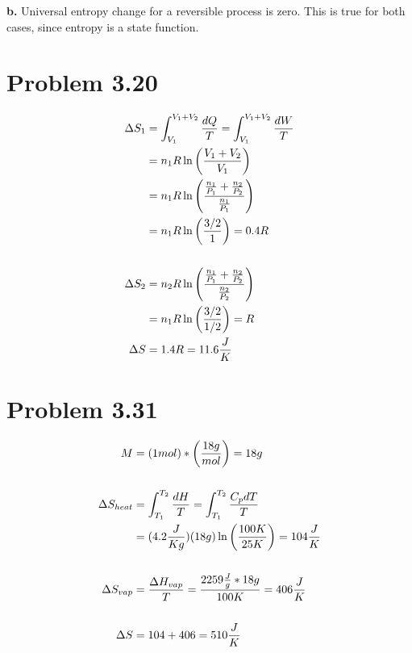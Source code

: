 \documentclass[10pt]{article} %
\begin{document}
\textbf{b.}
Universal entropy change for a reversible process is zero. This is true for both cases, since entropy is a state function.\\

\section{Problem 3.20}
\begin{align*}
  \Delta S_1 &= \int_{V_1}^{V_1+V_2} \frac{dQ}{T} = \int_{V_1}^{V_1+V_2} \frac{dW}{T}\\
  &= n_1R\ln\left(\frac{V_1+V_2}{V_1}\right)\\
  &= n_1R\ln\left(\frac{\frac{n_1}{P_1} + \frac{n_2}{P_2}}{\frac{n_1}{P_1}}\right)\\
  &= n_1R\ln\left(\frac{3/2}{1}\right) = 0.4R\\
  \vspace{1cm}\\
  \Delta S_2 &= n_2R\ln\left(\frac{\frac{n_1}{P_1} + \frac{n_2}{P_2}}{\frac{n_2}{P_2}}\right)\\
  &= n_1R\ln\left(\frac{3/2}{1/2}\right) = R\\
  \vspace{1cm}
  \Delta S &= 1.4R = 11.6 \frac{J}{K}\\
\end{align*}

\section{Problem 3.31}
\begin{align*}
  M &= (1 mol) * \left(\frac{18g}{mol}\right) = 18g\\
  \vspace{1cm}\\
  \Delta S_{heat} &= \int_{T_1}^{T_2} \frac{dH}{T} = \int_{T_1}^{T_2} \frac{C_p dT}{T}\\
  &= (4.2\frac{J}{K g})(18g)\ln\left(\frac{100K}{25K}\right) = 104 \frac{J}{K}\\
  \vspace{1cm}\\
  \Delta S_{vap} &= \frac{\Delta H_{vap}}{T} = \frac{2259 \frac{J}{g} * 18g}{100K} = 406 \frac{J}{K}\\
  \vspace{1cm}\\
  \Delta S &= 104 + 406 = 510 \frac{J}{K}\\
\end{align*}
\end{document}
